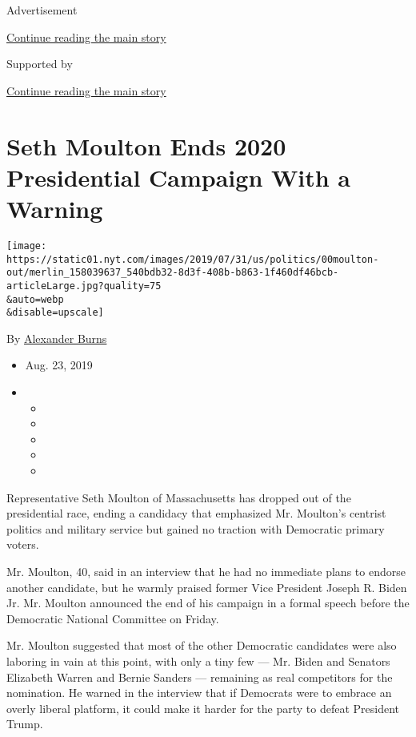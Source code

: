 Advertisement

\protect\hyperlink{after-top}{Continue reading the main story}

Supported by

\protect\hyperlink{after-sponsor}{Continue reading the main story}

\hypertarget{seth-moulton-ends-2020-presidential-campaign-with-a-warning}{%
\section{Seth Moulton Ends 2020 Presidential Campaign With a
Warning}\label{seth-moulton-ends-2020-presidential-campaign-with-a-warning}}

\texttt{[image: https://static01.nyt.com/images/2019/07/31/us/politics/00moulton-out/merlin\_158039637\_540bdb32-8d3f-408b-b863-1f460df46bcb-articleLarge.jpg?quality=75\\\&auto=webp\\\&disable=upscale]}

By \href{https://www.nytimes.com/by/alexander-burns}{Alexander Burns}

\begin{itemize}
\item
  Aug. 23, 2019
\item
  \begin{itemize}
  \item
  \item
  \item
  \item
  \item
  \end{itemize}
\end{itemize}

Representative Seth Moulton of Massachusetts has dropped out of the
presidential race, ending a candidacy that emphasized Mr. Moulton's
centrist politics and military service but gained no traction with
Democratic primary voters.

Mr. Moulton, 40, said in an interview that he had no immediate plans to
endorse another candidate, but he warmly praised former Vice President
Joseph R. Biden Jr. Mr. Moulton announced the end of his campaign in a
formal speech before the Democratic National Committee on Friday.

Mr. Moulton suggested that most of the other Democratic candidates were
also laboring in vain at this point, with only a tiny few --- Mr. Biden
and Senators Elizabeth Warren and Bernie Sanders --- remaining as real
competitors for the nomination. He warned in the interview that if
Democrats were to embrace an overly liberal platform, it could make it
harder for the party to defeat President Trump.

